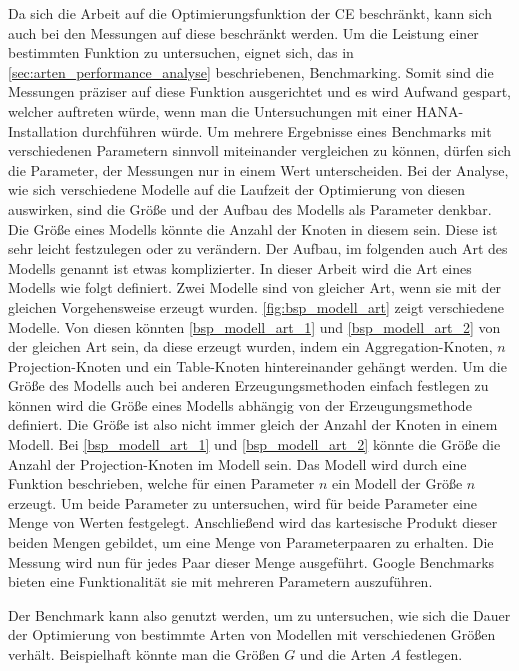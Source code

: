 Da sich die Arbeit auf die Optimierungsfunktion der \ac{CE} beschränkt, kann
sich auch bei den Messungen auf diese beschränkt werden.
Um die Leistung einer
bestimmten Funktion zu untersuchen, eignet sich, das in
\autoref{sec:arten_performance_analyse} beschriebenen, Benchmarking.
Somit sind die Messungen präziser auf diese Funktion ausgerichtet und es wird
Aufwand gespart, welcher auftreten würde, wenn man die Untersuchungen mit einer
HANA-Installation durchführen würde. Um mehrere Ergebnisse eines Benchmarks mit verschiedenen Parametern sinnvoll
miteinander vergleichen zu können, dürfen sich die Parameter, der Messungen nur
in einem Wert unterscheiden.  Bei der Analyse, wie sich
verschiedene Modelle auf die Laufzeit der Optimierung von diesen auswirken,
sind die Größe und der Aufbau des Modells als Parameter denkbar.  Die Größe
eines Modells könnte \zB die Anzahl der Knoten in diesem sein. Diese ist sehr
leicht festzulegen oder zu verändern. Der Aufbau, im folgenden auch Art des
Modells genannt ist etwas komplizierter. In dieser Arbeit wird die Art eines
Modells wie folgt definiert. Zwei Modelle sind von gleicher Art, wenn sie mit
der gleichen Vorgehensweise erzeugt wurden. \autoref{fig:bsp_modell_art} zeigt
verschiedene Modelle. Von diesen könnten \zB \autoref{bsp_modell_art_1} und
\autoref{bsp_modell_art_2} von der gleichen Art sein, da diese erzeugt wurden,
indem ein \foreignlanguage{english}{Aggregation}-Knoten, $n$
\foreignlanguage{english}{Projection}-Knoten und ein
\foreignlanguage{english}{Table}-Knoten hintereinander gehängt werden. Um die
Größe des Modells auch bei anderen Erzeugungsmethoden einfach festlegen zu
können wird die Größe eines Modells abhängig von der Erzeugungsmethode
definiert. Die Größe ist also nicht immer gleich der Anzahl der Knoten in einem
Modell. Bei \autoref{bsp_modell_art_1} und \autoref{bsp_modell_art_2} könnte
die Größe \zB die Anzahl der \foreignlanguage{english}{Projection}-Knoten im
Modell sein. Das Modell wird durch eine Funktion beschrieben, welche für einen
Parameter $n$ ein Modell der Größe $n$ erzeugt. Um beide Parameter zu
untersuchen, wird für beide Parameter eine Menge von Werten festgelegt.
Anschließend wird das kartesische Produkt dieser beiden Mengen gebildet, um
eine Menge von Parameterpaaren zu erhalten. Die Messung wird nun für jedes Paar
dieser Menge ausgeführt.  Google Benchmarks bieten eine
Funktionalität sie mit mehreren Parametern auszuführen.

Der Benchmark kann also genutzt werden, um zu untersuchen, wie sich die Dauer
der Optimierung von bestimmte Arten von Modellen mit verschiedenen Größen verhält.
Beispielhaft könnte man die Größen $G$ und die Arten $A$  festlegen.

